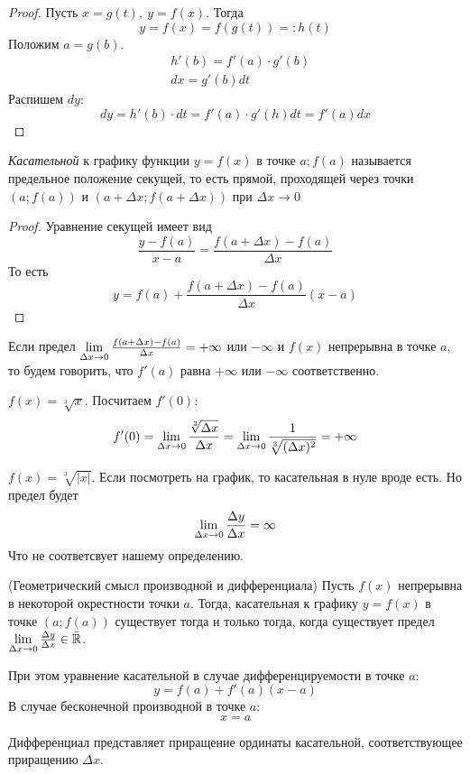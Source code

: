 \begin{proof}
	Пусть $x = g(t),\ y = f(x)$. Тогда
	$$
		y = f(x) = f(g(t)) =: h(t)
	$$
	Положим $a = g(b)$.
	\begin{align*}
		&h'(b) = f'(a) \cdot g'(b)
		\\
		&dx = g'(b)dt
	\end{align*}
	Распишем $dy$:
	$$
		dy = h'(b) \cdot dt = f'(a) \cdot g'(h) dt = f'(a) dx
	$$
\end{proof}

\begin{definition}
	\textit{Касательной} к графику функции $y = f(x)$ в точке $a; f(a)$ называется предельное положение секущей, то есть прямой, проходящей через точки $(a; f(a))$ и $(a + \Delta x; f(a + \Delta x))$ при $\Delta x \to 0$
\end{definition}

\begin{proof}
	Уравнение секущей имеет вид
	$$
		\frac{y - f(a)}{x - a} = \frac{f(a + \Delta x) - f(a)}{\Delta x}
	$$
	То есть
	$$
		y = f(a) + \frac{f(a + \Delta x) - f(a)}{\Delta x} (x - a)
	$$
\end{proof}

\begin{definition}
	Если предел $\lim\limits_{\Delta x \to 0} \frac{f(a + \Delta x) - f(a)}{\Delta x} = +\infty$ или $-\infty$ и $f(x)$ непрерывна в точке $a$, то будем говорить, что $f'(a)$ равна $+\infty$ или $-\infty$ соответственно.
\end{definition}

\begin{example}
	$f(x) = \sqrt[3]{x}$. Посчитаем $f'(0)$:
	$$
		f'(0) = \lim\limits_{\Delta x \to 0} \frac{\sqrt[3]{\Delta x}}{\Delta x} = \lim\limits_{\Delta x \to 0} \frac{1}{\sqrt[3]{(\Delta x)^2}} = +\infty
	$$
\end{example}

\begin{example}
	$f(x) = \sqrt[3]{|x|}$. Если посмотреть на график, то касательная в нуле вроде есть. Но предел будет
	$$
		\lim\limits_{\Delta x \to 0} \frac{\Delta y}{\Delta x} = \infty
	$$
	Что не соответсвует нашему определению.
\end{example}

\begin{theorem} (Геометрический смысл производной и дифференциала)
	Пусть $f(x)$ непрерывна в некоторой окрестности точки $a$. Тогда, касательная к графику $y = f(x)$ в точке $(a; f(a))$ существует тогда и только тогда, когда существует предел $\lim\limits_{\Delta x \to 0} \frac{\Delta y}{\Delta x} \in \bar{\mathbb{R}}$. 
	
	При этом уравнение касательной в случае дифференцируемости в точке $a$:
	$$
		y = f(a) + f'(a)(x - a)
	$$
	В случае бесконечной производной в точке $a$:
	$$
		x = a
	$$
	
	Дифференциал представляет приращение ординаты касательной, соответствующее приращению $\Delta x$.
\end{theorem}

